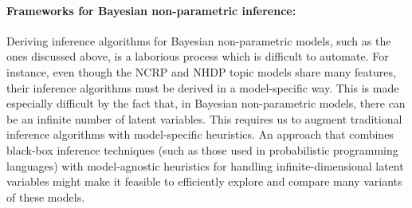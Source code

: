 \documentclass{article}
\begin{document}
\paragraph{Frameworks for Bayesian non-parametric inference:}
Deriving inference algorithms for Bayesian non-parametric models, such as the ones discussed above, is a laborious process which is difficult to automate.
For instance, even though the NCRP and NHDP topic models share many features, their inference algorithms must be derived in a model-specific way.
This is made especially difficult by the fact that, in Bayesian non-parametric models, there can be an infinite number of latent variables.
This requires us to augment traditional inference algorithms with model-specific heuristics.
An approach that combines black-box inference techniques (such as those used in probabilistic programming languages) with model-agnostic heuristics for handling infinite-dimensional latent variables might make it feasible to efficiently explore and compare many variants of these models.

\clearpage
\nocite{*}
%


\end{document}
